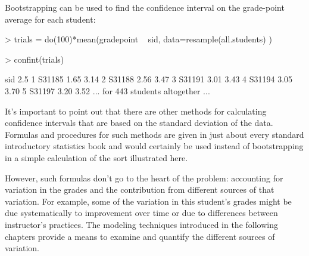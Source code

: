 
Bootstrapping can be used to find the confidence interval on the
grade-point average for each student:
\begin{Schunk}
\begin{Sinput}
> trials = do(100)*mean(gradepoint ~ sid, data=resample(all.students) )
\end{Sinput}
\end{Schunk}

\begin{Schunk}
\begin{Sinput}
> confint(trials)
\end{Sinput}
\end{Schunk}

\begin{Schunk}
\begin{Soutput}
     sid 2.5% 97.5%
1 S31185 1.65  3.14
2 S31188 2.56  3.47
3 S31191 3.01  3.43
4 S31194 3.05  3.70
5 S31197 3.20  3.52
... for 443 students altogether ...
\end{Soutput}
\end{Schunk}

It's important to point out that there are other methods for calculating
confidence intervals that are based on the standard deviation of the
data.  Formulas and procedures for such methods are given in just
about every standard introductory statistics book and would certainly
be used instead of bootstrapping in a simple calculation of the sort
illustrated here.  

However, such formulas don't go to the heart of the problem: 
accounting for variation in the grades and the contribution from
different sources of that variation.  For example, some of the
variation in this student's grades might be due systematically to
improvement over time or due to differences between instructor's
practices.  The modeling techniques introduced in the following
chapters provide a means to examine and quantify the different sources
of variation.

